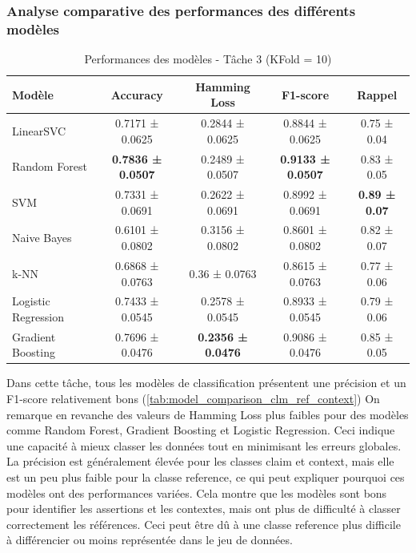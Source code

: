 \subsubsection{Analyse comparative des performances des différents modèles}
\begin{table}[H]
    \centering
    \caption{Performances des modèles - Tâche 3 (KFold = 10)}
    \begin{tabular}{lcccc}
        \toprule
        Modèle & Accuracy & Hamming Loss & F1-score & Rappel \\
        \midrule
        LinearSVC & 0.7171 ± 0.0625 & 0.2844 ± 0.0625 & 0.8844 ± 0.0625 & 0.75 ± 0.04 \\
        Random Forest & \textbf{0.7836 ± 0.0507} & 0.2489 ± 0.0507 & \textbf{0.9133 ± 0.0507} & 0.83 ± 0.05 \\
        SVM & 0.7331 ± 0.0691 & 0.2622 ± 0.0691 & 0.8992 ± 0.0691 & \textbf{0.89 ± 0.07} \\
        Naive Bayes & 0.6101 ± 0.0802 & 0.3156 ± 0.0802 & 0.8601 ± 0.0802 & 0.82 ± 0.07 \\
        k-NN & 0.6868 ± 0.0763 & 0.36 ± 0.0763 & 0.8615 ± 0.0763 & 0.77 ± 0.06 \\
        Logistic Regression & 0.7433 ± 0.0545 & 0.2578 ± 0.0545 & 0.8933 ± 0.0545 & 0.79 ± 0.06 \\
        Gradient Boosting & 0.7696 ± 0.0476 & \textbf{0.2356 ± 0.0476} & 0.9086 ± 0.0476 & 0.85 ± 0.05 \\
        \bottomrule
    \end{tabular}\label{tab:model_comparison_clm_ref_context}
\end{table}

Dans cette tâche, tous les modèles de classification présentent une précision et un F1-score relativement bons (\autoref{tab:model_comparison_clm_ref_context})
On remarque en revanche des valeurs de Hamming Loss plus faibles pour des modèles comme Random Forest, Gradient Boosting et Logistic Regression.
Ceci indique une capacité à mieux classer les données tout en minimisant les erreurs globales.\\

\noindent La précision est généralement élevée pour les classes claim et context, mais elle est un peu plus faible pour la classe reference, ce qui peut expliquer pourquoi ces modèles ont des performances variées.
Cela montre que les modèles sont bons pour identifier les assertions et les contextes, mais ont plus de difficulté à classer correctement les références.
Ceci peut être dû à une classe reference plus difficile à différencier ou moins représentée dans le jeu de données.\\

